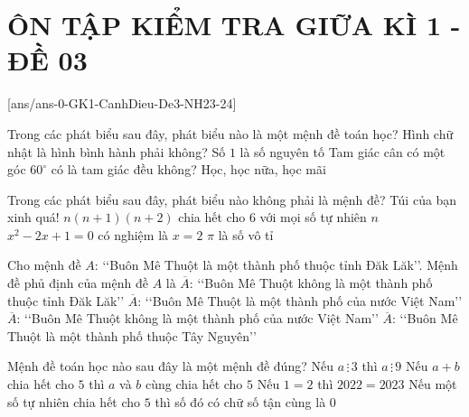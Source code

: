 \section*{ÔN TẬP KIỂM TRA GIỮA KÌ 1 - ĐỀ 03}
\setcounter{ex}{0}\setcounter{bt}{0}
[ans/ans-0-GK1-CanhDieu-De3-NH23-24]
\begin{ex}%
Trong các phát biểu sau đây, phát biểu nào là một mệnh đề toán học?
\choice
{Hình chữ nhật là hình bình hành phải không?}
{\True Số $1$ là số nguyên tố}
{Tam giác cân có một góc $60^{\circ}$ có là tam giác đều không?}
{Học, học nữa, học mãi}
\end{ex}
\begin{ex}%
Trong các phát biểu sau đây, phát biểu nào không phải là mệnh đề?
\choice
{\True Túi của bạn xinh quá!}
{$n(n+1)(n+2)$ chia hết cho $6$ với mọi số tự nhiên $n$}
{$x^2-2 x+1=0$ có nghiệm là $x=2$}
{$\pi$ là số vô tỉ}
\end{ex}
\begin{ex}%
Cho mệnh đề $A$: \lq\lq Buôn Mê Thuột là một thành phố thuộc tỉnh Đăk Lăk\rq\rq. Mệnh đề phủ định của mệnh đề $A$ là
\choice
{\True $\overline{A}$: \lq\lq Buôn Mê Thuột không là một thành phố thuộc tỉnh Đăk Lăk\rq\rq}
{$\overline{A}$: \lq\lq Buôn Mê Thuột là một thành phố của nước Việt Nam\rq\rq}
{$\overline{A}$: \lq\lq Buôn Mê Thuột không là một thành phố của nước Việt Nam\rq\rq}
{$\overline{A}$: \lq\lq Buôn Mê Thuột là một thành phố thuộc Tây Nguyên\rq\rq}
\end{ex}
\begin{ex}%
 Mệnh đề toán học nào sau đây là một mệnh đề đúng?
\choice
{Nếu $a\, \vdots \, 3$ thì $a \, \vdots \, 9$}
{Nếu $a+b$ chia hết cho $5$ thì $a$ và $b$ cùng chia hết cho $5$}
{\True Nếu $1=2$ thì $2022=2023$}
{Nếu một số tự nhiên chia hết cho $5$ thì số đó có chữ số tận cùng là $0$}
\end{ex}
